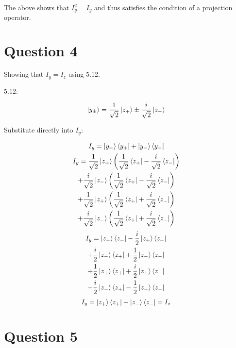 \documentclass{article}
\begin{document}
    The above shows that $I_y^2 = I_y$ and thus satisfies the condition of a projection operator. 


\section{Question 4}

    Showing that $I_y=I_z$ using 5.12.

    5.12:

    \begin{gather}
        \ket{y_\pm} = \frac{1}{\sqrt{2}}\ket{z_+} \pm \frac{i}{\sqrt{2}}\ket{z_-}
    \end{gather}

    Substitute directly into $I_y$:

    \begin{gather*}
        I_y = \ket{y_+}\bra{y_+} + \ket{y_-}\bra{y_-}\\
        I_y = \frac{1}{\sqrt{2}}\ket{z_+}\left(\frac{1}{\sqrt{2}}\bra{z_+}-\frac{i}{\sqrt{2}}\bra{z_-}\right)\\
        +     \frac{i}{\sqrt{2}}\ket{z_-}\left(\frac{1}{\sqrt{2}}\bra{z_+}-\frac{i}{\sqrt{2}}\bra{z_-}\right)\\
        +     \frac{1}{\sqrt{2}}\ket{z_+}\left(\frac{1}{\sqrt{2}}\bra{z_+}+\frac{i}{\sqrt{2}}\bra{z_-}\right)\\
        +     \frac{i}{\sqrt{2}}\ket{z_-}\left(\frac{1}{\sqrt{2}}\bra{z_+}+\frac{i}{\sqrt{2}}\bra{z_-}\right)\\
    \end{gather*}
    \begin{gather*}
       I_y = \ket{z_+}\bra{z_-} - \frac{i}{2}\ket{z_+}\bra{z_-}\\
        + \frac{i}{2}\ket{z_-}\bra{z_+} + \frac{1}{2}\ket{z_-}\bra{z_-}\\
        + \frac{1}{2}\ket{z_+}\bra{z_+} + \frac{i}{2}\ket{z_+}\bra{z_-}\\
        - \frac{i}{2}\ket{z_-}\bra{z_+} - \frac{1}{2}\ket{z_-}\bra{z_-}\\
    \end{gather*}
    \begin{gather}
        I_y = \ket{z_+}\bra{z_+} + \ket{z_-}\bra{z_-} = I_z
    \end{gather}


\section{Question 5}
\end{document}
